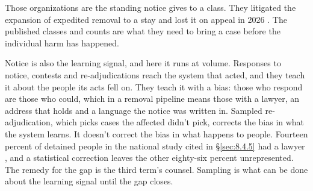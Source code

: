 Those organizations are the standing notice gives to a class. They litigated the expansion of expedited removal to a stay and lost it on appeal in 2026 \autocite{MontoyaGalvez2025Cobb,Knappenberger2026DCCir}. The published classes and counts are what they need to bring a case before the individual harm has happened.

Notice is also the learning signal, and here it runs at volume. Responses to notice, contests and re-adjudications reach the system that acted, and they teach it about the people its acts fell on. They teach it with a bias: those who respond are those who could, which in a removal pipeline means those with a lawyer, an address that holds and a language the notice was written in. Sampled re-adjudication, which picks cases the affected didn't pick, corrects the bias in what the system learns. It doesn't correct the bias in what happens to people. Fourteen percent of detained people in the national study cited in \S\ref{sec:8.4.5} had a lawyer \autocite{EaglyShafer2016Counsel}, and a statistical correction leaves the other eighty-six percent unrepresented. The remedy for the gap is the third term's counsel. Sampling is what can be done about the learning signal until the gap closes.
